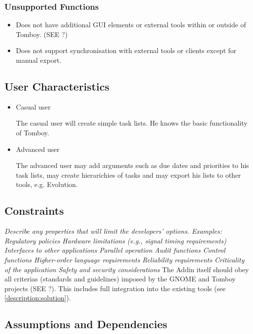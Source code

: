 	\subsubsection*{Unsupported Functions}
	\label{description:functions:unsupported}
	\begin{itemize}
		\item Does not have additional GUI elements or external tools within or outside of Tomboy. (SEE ?)
		\item Does not support synchronisation with external tools or clients except for manual export.
	\end{itemize}
	

\subsection{User Characteristics}
\label{description:usercharacteristics}
\begin{itemize}
\item Casual user

The casual user will create simple task lists. He knows the basic functionality of Tomboy.

\item Advanced user

The advanced user may add arguments such as due dates and priorities to his task lists, may create hierarichies of tasks and may export his lists to other tools, e.g. Evolution.
\end{itemize}


\subsection{Constraints}
\label{description:constraints}
\textit{Describe any properties that will limit the developers’ options. Examples:
Regulatory policies
Hardware limitations (e.g., signal timing requirements)
Interfaces to other applications
Parallel operation
Audit functions
Control functions
Higher-order language requirements
Reliability requirements
Criticality of the application
Safety and security considerations}
The Addin itself should obey all criterias (standards and guidelines) imposed by the GNOME and Tomboy projects (SEE ?).
This includes full integration into the existing tools (see \ref{description:solution}).


\subsection{Assumptions and Dependencies}
\label{description:assumptions}

